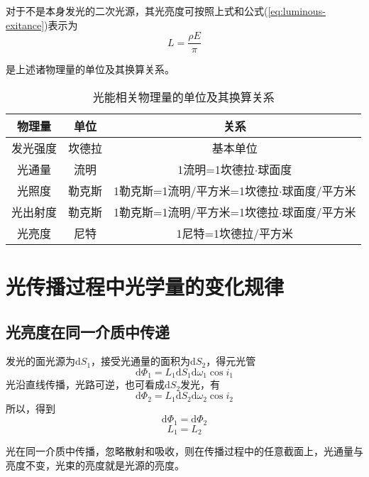 \documentclass[cn,10pt,chinesefont=founder,math=newtx,cite=super,twoside]{elegantbook}
\begin{document}
对于不是本身发光的二次光源，其光亮度可按照上式和公式(\ref{eq:luminous-exitance})表示为
\begin{equation}
L=\frac{\rho E}{\pi}
\end{equation}

 是上述诸物理量的单位及其换算关系。
\begin{table}[htbp]
	\centering
	\caption{光能相关物理量的单位及其换算关系}
	\begin{tabular}{ccc}
		\toprule
		物理量  & 单位  & 关系  \\
		\midrule
		发光强度 & 坎德拉 & 基本单位  \\
		光通量  & 流明  & 1流明=1坎德拉$\cdot$球面度  \\
		光照度  & 勒克斯 & 1勒克斯=1流明/平方米=1坎德拉$\cdot$球面度/平方米 \\
		光出射度 & 勒克斯 & 1勒克斯=1流明/平方米=1坎德拉$\cdot$球面度/平方米 \\
		光亮度  & 尼特  & 1尼特=1坎德拉/平方米 \\
		\bottomrule
	\end{tabular}
    \label{tab:optical-energy-physical-quantity}
\end{table}


\section{光传播过程中光学量的变化规律}
\subsection{光亮度在同一介质中传递}
发光的面光源为$\mathrm{d}S_1$，接受光通量的面积为$\mathrm{d}S_2$，得元光管
\begin{equation}
\mathrm{d}\varPhi_1=L_1\mathrm{d}S_1\mathrm{d}\omega_1\cos i_1
\end{equation}
光沿直线传播，光路可逆，也可看成$\mathrm{d}S_2$发光，有
\begin{equation}
\mathrm{d}\varPhi_2=L_1\mathrm{d}S_2\mathrm{d}\omega_2\cos i_2
\end{equation}
所以，得到
\begin{equation}
\mathrm{d}\varPhi_1=\mathrm{d}\varPhi_2
\end{equation}
\begin{equation}
L_1=L_2
\end{equation}
\begin{conclusion}
光在同一介质中传播，忽略散射和吸收，则在传播过程中的任意截面上，光通量与亮度不变，光束的亮度就是光源的亮度。
\end{conclusion}
\end{document}
